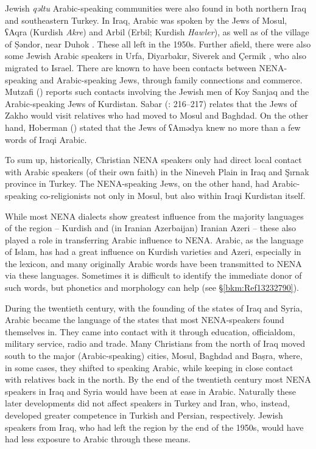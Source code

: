 \documentclass[output=paper]{langsci/langscibook}
\begin{document}
Jewish \textit{qəltu} Arabic-speaking communities were also found in both northern Iraq and southeastern Turkey. In Iraq, Arabic was spoken by the Jews of Mosul, ʕAqra (Kurdish \textit{Akre}) and Arbil (Erbil; Kurdish \textit{Hawler}), as well as of the village of Ṣəndor, near Duhok \citep[9]{Hoberman1989}. These all left in the 1950s. Further afield, there were also some Jewish Arabic speakers in Urfa, Diyarbakır, Siverek and Çermik \citep[4]{Jastrow1978}, who also migrated to Israel. There are known to have been contacts between NENA-speaking and Arabic-speaking Jews, through family connections and commerce. Mutzafi (\citeyear[6]{Mutzafi2004}) reports such contacts involving the Jewish men of Koy Sanjaq and the Arabic-speaking Jews of Kurdistan. Sabar (\citeyear{Sabar1978}: 216–217) relates that the Jews of Zakho would visit relatives who had moved to Mosul and Baghdad. On the other hand, Hoberman (\citeyear[9]{Hoberman1989}) stated that the Jews of ʕAmədya knew no more than a few words of Iraqi Arabic.

To sum up, historically, Christian NENA speakers only had direct local contact with Arabic speakers (of their own faith) in the Nineveh Plain in Iraq and Şırnak province in Turkey. The NENA-speaking Jews, on the other hand, had Arabic-speaking co-religionists not only in Mosul, but also within Iraqi Kurdistan itself.

While most NENA dialects show greatest influence from the majority languages of the region – Kurdish and (in Iranian Azerbaijan) Iranian Azeri – these also played a role in transferring Arabic influence to NENA. Arabic, as the language of Islam, has had a great influence on Kurdish varieties and Azeri, especially in the lexicon, and many originally Arabic words have been transmitted to NENA via these languages. Sometimes it is difficult to identify the immediate donor of such words, but phonetics and morphology can help (see §\ref{bkm:Ref13232790}).

During the twentieth century, with the founding of the states of Iraq and Syria, Arabic became the language of the states that most NENA-speakers found themselves in. They came into contact with it through education, officialdom, military service, radio and trade. Many Christians from the north of Iraq moved south to the major (Arabic-speaking) cities, Mosul, Baghdad and Baṣra, where, in some cases, they shifted to speaking Arabic, while keeping in close contact with relatives back in the north. By the end of the twentieth century most NENA speakers in Iraq and Syria would have been at ease in Arabic. Naturally these later developments did not affect speakers in Turkey and Iran, who, instead, developed greater competence in Turkish and Persian, respectively. Jewish speakers from Iraq, who had left the region by the end of the 1950s, would have had less exposure to Arabic through these means.
\end{document}
